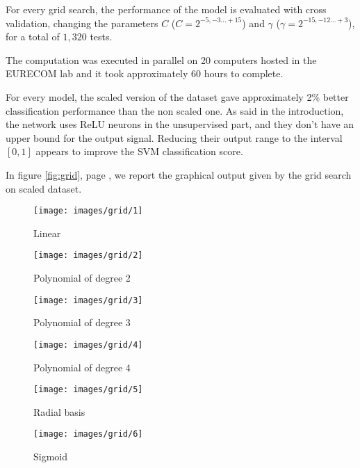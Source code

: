 For every grid search, the performance of the model is evaluated with cross
validation, changing the parameters $C$ ($C = 2^{-5, -3 \ldots +15}$) and $\gamma$
($\gamma = 2^{-15, -12 \ldots +3}$), for a total of $1,320$ tests.

The computation was executed in parallel on 20 computers hosted in the EURECOM
lab and it took approximately 60 hours to complete. 

For every model, the scaled version of the dataset gave approximately 2\% better
classification performance than the non scaled one. As said in the introduction,
the network uses ReLU neurons in the unsupervised part, and they don't have an
upper bound for the output signal. Reducing their output range to the interval
$[0, 1]$ appears to improve the SVM classification score.

In figure \ref{fig:grid}, page \pageref{fig:grid}, we report the graphical output
given by the grid search on scaled dataset.

\begin{figure*}[hbtp]\centering
\centering
\begin{subfigure}{.47\textwidth}
    \centering
    \texttt{[image: images/grid/1]}
    \caption{Linear}
    \label{fig:grid1}
\end{subfigure}\hfill%
\begin{subfigure}{.47\textwidth}
    \centering
    \texttt{[image: images/grid/2]}
    \caption{Polynomial of degree 2}
    \label{fig:grid2}
\end{subfigure}
\begin{subfigure}{.47\textwidth}
    \centering
    \texttt{[image: images/grid/3]}
    \caption{Polynomial of degree 3}
    \label{fig:grid3}
\end{subfigure}\hfill%
\begin{subfigure}{.47\textwidth}
    \centering
    \texttt{[image: images/grid/4]}
    \caption{Polynomial of degree 4}
    \label{fig:grid4}
\end{subfigure}
\begin{subfigure}{.47\textwidth}
    \centering
    \texttt{[image: images/grid/5]}
    \caption{Radial basis}
    \label{fig:grid5}
\end{subfigure}\hfill%
\begin{subfigure}{.47\textwidth}
    \centering
    \texttt{[image: images/grid/6]}
    \caption{Sigmoid}
    \label{fig:grid6}
\end{subfigure}
\caption{Grid search results}
\label{fig:grid}
\end{figure*}


